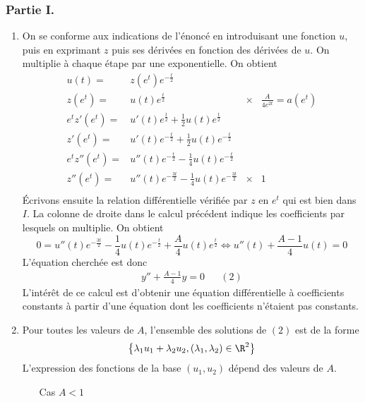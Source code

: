 \subsubsection*{Partie I.}
\begin{enumerate}
 \item On se conforme aux indications de l'énoncé en introduisant une fonction $u$, puis en exprimant $z$ puis ses dérivées en fonction des dérivées de $u$. On multiplie à chaque étape par une exponentielle. On obtient
\begin{align*}
 u(t) =& z(e^t)e^{-\frac{t}{2}} & &\\
z(e^t) =& u(t)e^{\frac{t}{2}} & \times& \frac{A}{4e^{2t}}=a(e^t) \\
e^t z'(e^t) =& u'(t)e^{\frac{t}{2}}+\frac{1}{2}u(t)e^{\frac{t}{2}} & & \\
z'(e^t) =& u'(t)e^{-\frac{t}{2}}+\frac{1}{2}u(t)e^{-\frac{t}{2}} & & \\
e^t z''(e^t) =& u''(t)e^{-\frac{t}{2}}-\frac{1}{4}u(t)e^{-\frac{t}{2}} & & \\
z''(e^t) =& u''(t)e^{-\frac{3t}{2}}-\frac{1}{4}u(t)e^{-\frac{3t}{2}} & \times& 1 \\
\end{align*}
\'Ecrivons ensuite la relation différentielle vérifiée par $z$ en $e^t$ qui est bien dans $I$. La colonne de droite dans le calcul précédent indique les coefficients par lesquels on multiplie. On obtient
\begin{displaymath}
 0=u''(t)e^{-\frac{3t}{2}} -\frac{1}{4}u(t)e^{-\frac{t}{2}} +\frac{A}{4}u(t)e^{\frac{t}{2}}
\Leftrightarrow u''(t)+\frac{A-1}{4}u(t)=0
\end{displaymath}
L'équation cherchée est donc
\begin{align*}
 y''+\frac{A-1}{4}y=0 & & (2)
\end{align*}
L'intérêt de ce calcul est d'obtenir une équation différentielle à coefficients constants à partir d'une équation dont les coefficients n'étaient pas constants.
\item Pour toutes les valeurs de $A$, l'ensemble des solutions de $(2)$ est de la forme
\begin{displaymath}
 \left\lbrace \lambda_1u_1 + \lambda_2 u_2, (\lambda_1,\lambda_2)\in \R^2\right\rbrace 
\end{displaymath}
L'expression des fonctions de la base $(u_1,u_2)$ dépend des valeurs de $A$.
\begin{itemize}
 \item[Cas $A<1$]
\begin{align*}

\end{align*}
\end{itemize}
\end{enumerate}
